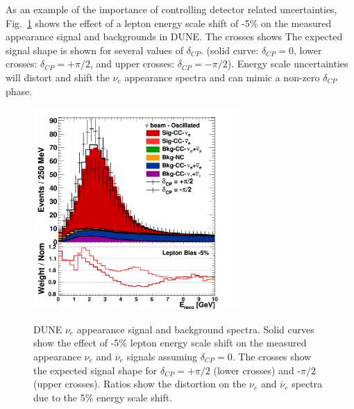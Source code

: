 As an example of the importance of controlling detector related uncertainties,
Fig.~\ref{fig:spectraleffect} shows the effect of a lepton energy scale 
shift of -5\% on the measured 
appearance signal %
 and backgrounds in DUNE. 
The crosses shows 
The expected signal shape is shown for several values of $\delta_{CP}$. 
(solid curve: $\delta_{CP}=0$, lower crosses: $\delta_{CP}=+\pi/2$, and upper crosses: $\delta_{CP}=-\pi/2$). 
Energy scale uncertainties will distort and shift the $\nu_e$ appearance spectra and
can mimic a non-zero
$\delta_{CP}$ phase.
\begin{figure}[h!]
\centering
\includegraphics[width=0.7\textwidth,height=7.7cm]{figures/CSPP_LeptonBias_nue_app_FHC}
\label{fig:spectraleffect}
  \caption{DUNE $\nu_e$ appearance signal and background spectra. 
Solid curves show the effect of -5\% lepton energy scale shift on the 
measured appearance $\nu_e$ and $\overline{\nu}_e$ signals assuming $\delta_{CP}=0$.
The crosses show the expected signal shape for $\delta_{CP}=+\pi/2$ (lower crosses) and -$\pi/2$  (upper crosses). 
Ratios show the distortion on the $\nu_e$ and $\overline{\nu}_e$ spectra due to the 
5\% energy scale shift. 
}
\end{figure}


